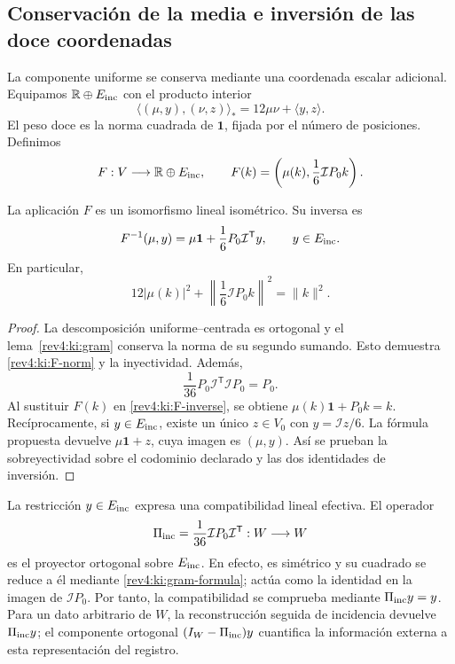 \subsection{Conservación de la media e inversión de las doce coordenadas}
\label{rev4:ki:full-subsection}

La componente uniforme se conserva mediante una coordenada escalar
adicional. Equipamos \(\mathbb R\oplus E_{\rm inc}\) con el producto
interior
\[
 \langle(\mu,y),(\nu,z)\rangle_*=
 12\mu\nu+\langle y,z\rangle.
\]
El peso doce es la norma cuadrada de \(\mathbf1\), fijada por el
número de posiciones. Definimos
\begin{equation}
 F:V\longrightarrow\mathbb R\oplus E_{\rm inc},\qquad
 F(k)=\left(\mu(k),\frac16\mathcal I P_0k\right).
 \label{rev4:ki:F}
\end{equation}

\begin{theorem}
\label{rev4:ki:full-isometry}
La aplicación \(F\) es un isomorfismo lineal isométrico. Su inversa
es
\begin{equation}
 F^{-1}(\mu,y)=\mu\mathbf1+
                  \frac16P_0\mathcal I^{\mathsf T}y,
 \qquad y\in E_{\rm inc}.
 \label{rev4:ki:F-inverse}
\end{equation}
En particular,
\begin{equation}
 12|\mu(k)|^2+
 \left\|\frac16\mathcal I P_0k\right\|^2=\|k\|^2.
 \label{rev4:ki:F-norm}
\end{equation}
\end{theorem}
\begin{proof}
La descomposición uniforme--centrada es ortogonal y el
lema~\ref{rev4:ki:gram} conserva la norma de su segundo sumando.
Esto demuestra \eqref{rev4:ki:F-norm} y la inyectividad.
Además,
\[
 \frac1{36}P_0\mathcal I^{\mathsf T}\mathcal I P_0=P_0.
\]
Al sustituir \(F(k)\) en \eqref{rev4:ki:F-inverse}, se obtiene
\(\mu(k)\mathbf1+P_0k=k\). Recíprocamente, si
\(y\in E_{\rm inc}\), existe un único \(z\in V_0\) con
\(y=\mathcal I z/6\). La fórmula propuesta devuelve
\(\mu\mathbf1+z\), cuya imagen es \((\mu,y)\). Así se
prueban la sobreyectividad sobre el codominio declarado y las dos
identidades de inversión.
\end{proof}

La restricción \(y\in E_{\rm inc}\) expresa una compatibilidad
lineal efectiva. El operador
\begin{equation}
 \Pi_{\rm inc}=\frac1{36}\mathcal I P_0
                         \mathcal I^{\mathsf T}:W\longrightarrow W
 \label{rev4:ki:inc-projector}
\end{equation}
es el proyector ortogonal sobre \(E_{\rm inc}\). En efecto, es
simétrico y su cuadrado se reduce a él mediante
\eqref{rev4:ki:gram-formula}; actúa como la identidad en la imagen
de \(\mathcal I P_0\). Por tanto, la compatibilidad se comprueba
mediante \(\Pi_{\rm inc}y=y\). Para un dato arbitrario de
\(W\), la reconstrucción seguida de incidencia devuelve
\(\Pi_{\rm inc}y\); el componente ortogonal
\((I_W-\Pi_{\rm inc})y\) cuantifica la información externa a
esta representación del registro.

